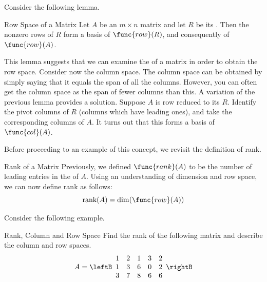 Consider the following lemma. 

\begin{lemma}{Row Space of a \EF\;Matrix}\label{lem:echelonformrowspace}
Let $A$ be an $m \times n$ matrix and let $R$ be its \ef. Then the nonzero rows of $R$ form a basis of $\func{row}(R)$, and consequently of $\func{row}(A)$. 
\end{lemma}

This lemma suggests that we can examine the \ef\;of a matrix in order to obtain the row space. Consider now the column space. The column space can be obtained by simply saying that
it equals the span of all the columns. However, you can often get the column
space as the span of fewer columns than this. A variation of the previous lemma provides a solution. Suppose $A$ is row reduced to its \ef\;$R$. Identify the pivot columns of $R$ (columns which have leading ones), and take the corresponding columns of $A$. It turns out that this forms a basis of $\func{col}(A)$. 

Before proceeding to an example of this concept, we revisit the definition of rank. 

\begin{definition}{Rank of a Matrix}\label{def:rankrowspace}
Previously, we defined $\func{rank}(A)$ to be the number of leading entries in the \ef\;of $A$. Using an understanding of dimension and row space, we can now define rank as follows:
\[
\mbox{rank}(A) = \dim(\func{row}(A))
\]
\end{definition}

Consider the following example. 

\begin{example}{Rank, Column and Row Space}\label{exa:rankcolumnrowspace}
Find the rank of the following matrix and describe the column and row spaces.
\begin{equation*}
A = 
\leftB
\begin{array}{rrrrr}
1 & 2 & 1 & 3 & 2 \\
1 & 3 & 6 & 0 & 2 \\
3 & 7 & 8 & 6 & 6
\end{array}
\rightB  
\end{equation*}
\end{example}

